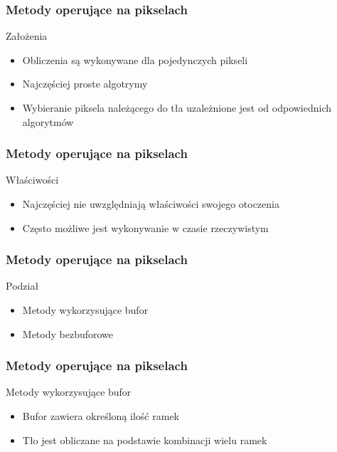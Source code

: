 \documentclass{beamer}
\begin{document}

\begin{frame}
\frametitle{Metody operujące na pikselach}
\begin{block}{Założenia}
\begin{itemize}
\item Obliczenia są wykonywane dla pojedynczych pikseli
\item Najczęściej proste algotrymy
\item Wybieranie piksela należącego do tła uzależnione jest od odpowiednich algorytmów
\end{itemize}
\end{block}


\end{frame}

\begin{frame}
\frametitle{Metody operujące na pikselach}
\begin{block}{Właściwości}
\begin{itemize}
\item Najczęściej nie uwzględniają właściwości swojego otoczenia
\item Często możliwe jest wykonywanie w czasie rzeczywistym
\end{itemize}
\end{block}


\end{frame}

\begin{frame}
\frametitle{Metody operujące na pikselach}
\begin{block}{Podział}
\begin{itemize}
\item Metody wykorzysujące bufor
\item Metody bezbuforowe
\end{itemize}
\end{block}


\end{frame}

\begin{frame}
\frametitle{Metody operujące na pikselach}
\begin{block}{Metody wykorzysujące bufor}
\begin{itemize}
\item Bufor zawiera określoną ilość ramek
\item Tło jest obliczane na podstawie kombinacji wielu ramek
\end{itemize}
\end{block}


\end{frame}
\end{document}
